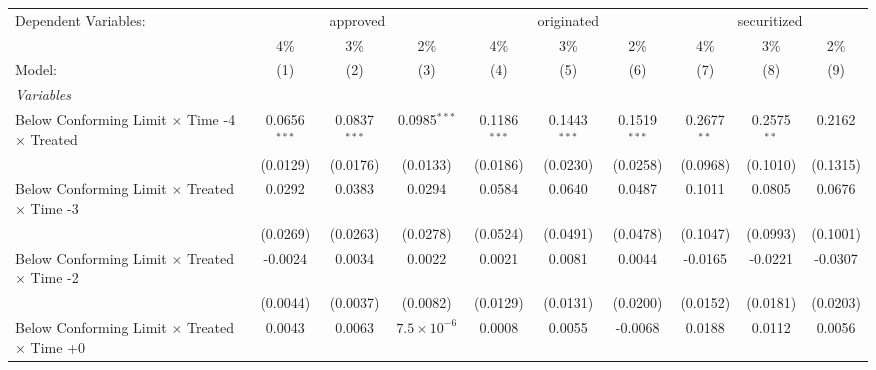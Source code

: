 \begingroup
\centering
\begin{tabular}{lccccccccc}
   \tabularnewline \midrule \midrule
   Dependent Variables: & \multicolumn{3}{c}{approved} & \multicolumn{3}{c}{originated} & \multicolumn{3}{c}{securitized}\\
                                                              & 4\%            & 3\%            & 2\%                  & 4\%            & 3\%            & 2\%            & 4\%            & 3\%            & 2\% \\    
   Model:                                                     & (1)            & (2)            & (3)                  & (4)            & (5)            & (6)            & (7)            & (8)            & (9)\\  
   \midrule
   \emph{Variables}\\
   Below Conforming Limit $\times$ Time -4 $\times$ Treated   & 0.0656$^{***}$ & 0.0837$^{***}$ & 0.0985$^{***}$       & 0.1186$^{***}$ & 0.1443$^{***}$ & 0.1519$^{***}$ & 0.2677$^{**}$  & 0.2575$^{**}$  & 0.2162\\   
                                                              & (0.0129)       & (0.0176)       & (0.0133)             & (0.0186)       & (0.0230)       & (0.0258)       & (0.0968)       & (0.1010)       & (0.1315)\\   
   Below Conforming Limit $\times$ Treated $\times$ Time -3   & 0.0292         & 0.0383         & 0.0294               & 0.0584         & 0.0640         & 0.0487         & 0.1011         & 0.0805         & 0.0676\\   
                                                              & (0.0269)       & (0.0263)       & (0.0278)             & (0.0524)       & (0.0491)       & (0.0478)       & (0.1047)       & (0.0993)       & (0.1001)\\   
   Below Conforming Limit $\times$ Treated $\times$ Time -2   & -0.0024        & 0.0034         & 0.0022               & 0.0021         & 0.0081         & 0.0044         & -0.0165        & -0.0221        & -0.0307\\   
                                                              & (0.0044)       & (0.0037)       & (0.0082)             & (0.0129)       & (0.0131)       & (0.0200)       & (0.0152)       & (0.0181)       & (0.0203)\\   
   Below Conforming Limit $\times$ Treated $\times$ Time +0   & 0.0043         & 0.0063         & $7.5\times 10^{-6}$  & 0.0008         & 0.0055         & -0.0068        & 0.0188         & 0.0112         & 0.0056\\   

\end{tabular}
